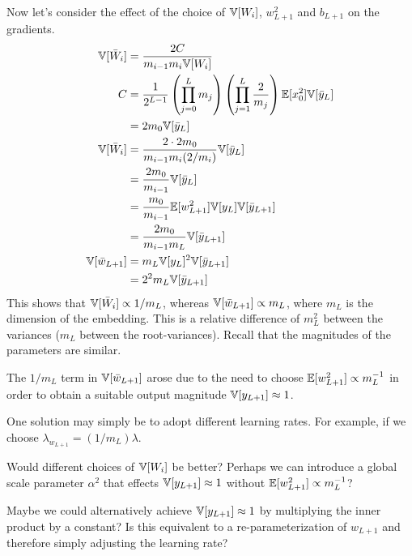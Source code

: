 Now let's consider the effect of the choice of $\mathbb{V}[W_{i}]$, $w_{L+1}^2$ and $b_{L+1}$ on the gradients.
\begin{align}
\mathbb{V}[\bar{W}_{i}]
& = \frac{2 C}{m_{i-1} m_{i} \mathbb{V}[W_{i}]} \\
C & = \frac{1}{2^{L-1}} \left(\prod_{j=0}^{L} m_{j} \right) \left(\prod_{j=1}^{L} \frac{2}{m_{j}} \right)
  \mathbb{E}[x_{0}^2] \mathbb{V}[\bar{y}_{L}] \\
& = 2 m_{0} \mathbb{V}[\bar{y}_{L}] \\
\mathbb{V}[\bar{W}_{i}]
& = \frac{2 \cdot 2 m_{0}}{m_{i-1} m_{i} (2 / m_{i})} \mathbb{V}[\bar{y}_{L}] \\
& = \frac{2 m_{0}}{m_{i-1}} \mathbb{V}[\bar{y}_{L}] \\
& = \frac{m_{0}}{m_{i-1}} \mathbb{E}[w_{L+1}^2] \mathbb{V}[y_{L}] \mathbb{V}[\bar{y}_{L+1}] \\
& = \frac{2 m_{0}}{m_{i-1} m_{L}} \mathbb{V}[\bar{y}_{L+1}] \\
\mathbb{V}[\bar{w}_{L+1}]
& = m_{L} \mathbb{V}[y_{L}]^{2} \mathbb{V}[\bar{y}_{L+1}] \\
& = 2^2 m_{L} \mathbb{V}[\bar{y}_{L+1}]
\end{align}
This shows that $\mathbb{V}[\bar{W}_{i}] \propto 1/m_{L}$, whereas $\mathbb{V}[\bar{w}_{L+1}] \propto m_{L}$, where $m_{L}$ is the dimension of the embedding.
This is a relative difference of $m_{L}^2$ between the variances ($m_{L}$ between the root-variances).
Recall that the magnitudes of the parameters are similar.

The $1/m_{L}$ term in $\mathbb{V}[\bar{w}_{L+1}]$ arose due to the need to choose $\mathbb{E}[w_{L+1}^2] \propto m_{L}^{-1}$ in order to obtain a suitable output magnitude $\mathbb{V}[y_{L+1}] \approx 1$.


One solution may simply be to adopt different learning rates.
For example, if we choose $\lambda_{w_{L+1}} = (1 / m_{L}) \lambda$.

Would different choices of $\mathbb{V}[W_{i}]$ be better?
Perhaps we can introduce a global scale parameter $\alpha^2$ that effects $\mathbb{V}[y_{L+1}] \approx 1$ without $\mathbb{E}[w_{L+1}^2] \propto m_{L}^{-1}$?

Maybe we could alternatively achieve $\mathbb{V}[y_{L+1}] \approx 1$ by multiplying the inner product by a constant?
Is this equivalent to a re-parameterization of $w_{L+1}$ and therefore simply adjusting the learning rate?

